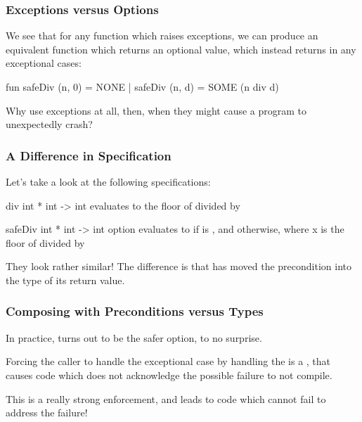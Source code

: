 \documentclass[aspectratio=169]{beamer}
\begin{document}
\begin{frame}[fragile]
  \frametitle{Exceptions versus Options}

  We see that for any function which raises exceptions, we can produce
  an equivalent function which returns an optional value, which instead
  returns  in any exceptional cases:

  \begin{codeblock}
    fun safeDiv (n, 0) = NONE 
      | safeDiv (n, d) = SOME (n div d)
  \end{codeblock}

  \vspace{\fill}

  Why use exceptions at all, then, when they might cause a program to
  unexpectedly crash?
\end{frame}

\begin{frame}[fragile]
  \frametitle{A Difference in Specification}

  Let's take a look at the following specifications:

  \spec
    {div}
    {int * int -> int}
    {}
    { evaluates to the
    floor of  divided by }

  \spec
    {safeDiv}
    {int * int -> int option}
    {}
    { evaluates to  if  is , 
    and  otherwise, where x is the
    floor of  divided by  }

  They look rather similar! The difference is that  has 
  moved the precondition into the type of its return value.
\end{frame}

\begin{frame}[fragile]
  \frametitle{Composing with Preconditions versus Types}

  In practice,  turns out to be the safer option,
  to no surprise.

  \vspace{\fill}

  Forcing the caller to handle the exceptional case by handling the
   is a , that causes code which
  does not acknowledge the possible failure to not compile.

  \vspace{\fill}

  This is a really strong enforcement, and leads to code which cannot
  fail to address the failure!
\end{frame}
\end{document}

